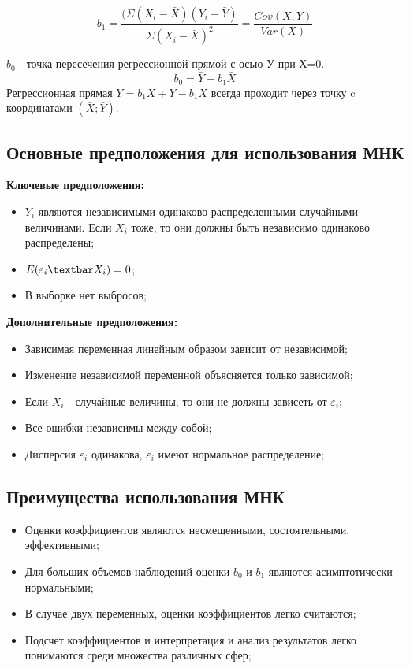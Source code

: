 \documentclass{article}
\begin{document}
\[b_1 = \frac{(\Sigma(X_i - \bar{X})(Y_i - \bar{Y})} {\Sigma(X_i -\bar{X})^2 } = \frac{Cov(X,Y)}{Var(X)}\]

\(b_0\) - точка пересечения регрессионной прямой с осью У при Х=0.
\[b_0  = \bar{Y} - b_1\bar{X}\]
Регрессионная прямая \(Y = b_1X + \bar{Y} - b_1\bar{X}\) всегда проходит через точку c координатами \((\bar{X};\bar{Y})\).

\subsection{Основные предположения для использования МНК}
\textbf{Ключевые предположения:}
\begin{itemize}
    \item \(Y_i\) являются независимыми одинаково распределенными случайными величинами. Если \(X_i\) тоже, то они должны быть независимо одинаково распределены;
    \item \(E(\varepsilon_i \textbar X_i) = 0\);
    \item В выборке нет выбросов;
\end{itemize}

\textbf{Дополнительные предположения:}
\begin{itemize}
    \item Зависимая переменная линейным образом зависит от независимой;
    \item Изменение независимой переменной объясняется только зависимой;
    \item Если \(X_i\) - случайные величины, то они не должны зависеть от \(\varepsilon_i \);
    \item Все ошибки независимы между собой;
    \item Дисперсия \(\varepsilon_i \) одинакова, \(\varepsilon_i \) имеют нормальное распределение;
\end{itemize}

\subsection{Преимущества использования МНК}
\begin{itemize}
    \item Оценки коэффициентов являются несмещенными, состоятельными, эффективными;
    \item Для больших объемов наблюдений оценки \(b_0\) и \(b_1\) являются асимптотически нормальными;
    \item В случае двух переменных, оценки коэффициентов легко считаются;
    \item Подсчет коэффициентов и интерпретация и анализ результатов легко понимаются среди множества различных сфер;
\end{itemize}
\end{document}
